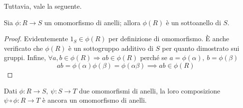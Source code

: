 \documentclass[11pt, a4paper]{scrartcl}
\theoremstyle{definition}
\numberwithin{esempio}{section}
\theoremstyle{definition}
\numberwithin{obs}{section}
\numberwithin{nota}{section}
\numberwithin{equation}{subsection}
\begin{document}
Tuttavia, vale la seguente.
\begin{prop}
	{}{}
	Sia $\phi :R \to S$ un omomorfismo di anelli; allora $\phi (R)$ \`e un sottoanello di $S$.
	\begin{proof}
		Evidentemente $1_S \in \phi (R)$ per definizione di omomorfismo.
		\`E anche verificato che $\phi (R)$ \`e un sottogruppo additivo di $S$ per quanto dimostrato sui gruppi.
		Infine, $\forall a,b \in \phi (R) \Rightarrow ab \in \phi (R)$ perch\'e se $a = \phi (\alpha ) , \ b = \phi (\beta )$
		\[
		ab = \phi (\alpha ) \phi (\beta ) = \phi (\alpha \beta ) \implies ab \in \phi (R)
		\] 
	\end{proof}
\end{prop}
\begin{prop}
	{}{}
	Dati $\phi :R \to S, \ \psi :S \to T$ due omomorfismi di anelli, la loro composizione $\psi \circ \phi: R \to T $ \`e ancora un omomorfismo di anelli.
\end{prop}
\end{document}

